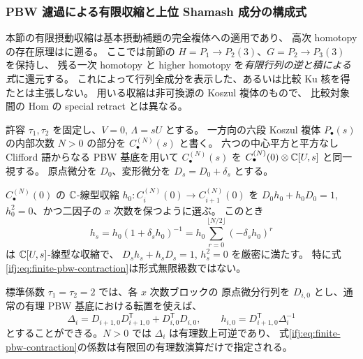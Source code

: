 \subsubsection{PBW 濾過による有限収縮と上位 Shamash 成分の構成式}
\label{ifj:subsubsec:filtered-shamash}

本節の有限摂動収縮は基本摂動補題\cite{TWCrainic}の完全複体への適用であり、
高次 homotopy の存在原理は\cite[Definition~3.4.1, Proposition~3.4.2]{CMOEisenbudPeeva}に遡る。
ここでは前節の $H=P_1\to P_2(3)$、$G=P_2\to P_3(3)$ を保持し、
残る一次 homotopy と higher homotopy を\emph{有限行列の逆と積による式}に還元する。
これによって行列全成分を表示した、あるいは比較 Ku 核を得たとは主張しない。
用いる収縮は非可換源の Koszul 複体のもので、
比較対象間の Hom の special retract とは異なる。

\begin{lemma}
\label{ifj:lem:filtered-koszul-contraction}
許容 $\tau_1,\tau_2$ を固定し、$V=0$, $\Lambda=sU$ とする。
一方向の六段 Koszul 複体 $P_\bullet(s)$ の内部次数 $N>0$ の部分を
$C_\bullet^{(N)}(s)$ と書く。
六つの中心平方と平方なし Clifford 語からなる PBW 基底を用いて
$C_\bullet^{(N)}(s)$ を $C_\bullet^{(N)}(0)\otimes\mathbb C[U,s]$ と同一視する。
原点微分を $D_0$、変形微分を $D_s=D_0+\delta_s$ とする。

$C_\bullet^{(N)}(0)$ の $\mathbb C$-線型収縮
$h_0:C_i^{(N)}(0)\to C_{i+1}^{(N)}(0)$ を
$D_0h_0+h_0D_0=1$, $h_0^2=0$、かつ二因子の $x$ 次数を保つように選ぶ。
このとき
\begin{equation}\label{ifj:eq:finite-pbw-contraction}
 \boxed{\displaystyle
 h_s=h_0(1+\delta_sh_0)^{-1}
    =h_0\sum_{r=0}^{\lfloor N/2\rfloor}(-\delta_sh_0)^r}
\end{equation}
は $\mathbb C[U,s]$-線型な収縮で、
$D_sh_s+h_sD_s=1$, $h_s^2=0$ を厳密に満たす。
特に式\eqref{ifj:eq:finite-pbw-contraction}は形式無限級数ではない。

標準係数 $\tau_1=\tau_2=2$ では、各 $x$ 次数ブロックの
原点微分行列を $D_{i,0}$ とし、通常の有理 PBW 基底における転置を使えば、
\begin{equation}\label{ifj:eq:filtered-koszul-hodge}
 \Delta_i=D_{i+1,0}D_{i+1,0}^{\mathsf T}
              +D_{i,0}^{\mathsf T}D_{i,0},
 \qquad h_{i,0}=D_{i+1,0}^{\mathsf T}\Delta_i^{-1}
\end{equation}
とすることができる。$N>0$ では $\Delta_i$ は有理数上可逆であり、
式\eqref{ifj:eq:finite-pbw-contraction}の係数は有限回の有理数演算だけで指定される。
\end{lemma}

